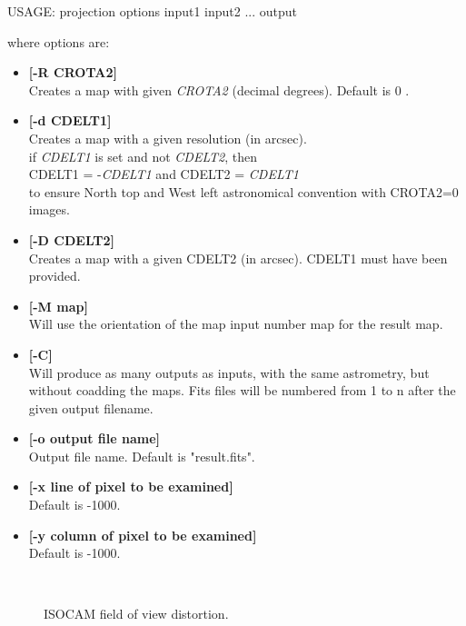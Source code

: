 \begin{center}
 USAGE: projection  options input1 input2 ... output  
\end{center}
where options are:
\begin{itemize}
\item {\bf [-R CROTA2]} \\
Creates a map with given {\em CROTA2} (decimal degrees).
Default is 0 .
\item {\bf [-d CDELT1]} \\
Creates a map with a given resolution (in arcsec). \\
if {\em CDELT1} is set and not {\em CDELT2}, then  \\
                 CDELT1 = -{\em CDELT1} and CDELT2 = {\em CDELT1} \\
to ensure North top and West left astronomical convention  with CROTA2=0 images.
\item {\bf [-D CDELT2]} \\
 Creates a map with a given CDELT2 (in arcsec). CDELT1 must have been provided.
\item {\bf [-M map]} \\
 Will use the orientation of the map input number map for the result map.
\item {\bf [-C]} \\
Will produce as many outputs as inputs, with the same astrometry, 
but without coadding the maps. Fits files will be numbered from 1 to n 
after the given output filename.
\item {\bf [-o output file name]} \\
Output file name. Default is "result.fits". 
\item {\bf [-x line of pixel to be examined]} \\
Default is -1000.
\item {\bf [-y column of pixel to be examined]} \\
 Default is -1000.
\end{itemize}

\begin{figure}[htb]
\centerline{
\hbox{
}}
\caption{ISOCAM field of view distortion.}
\label{fig_disto}
\end{figure}

 
